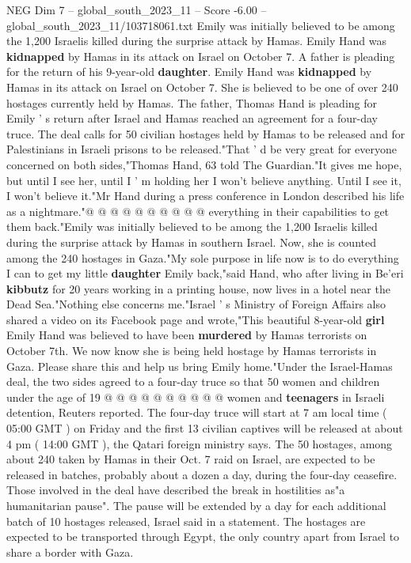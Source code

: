 \begin{textsample}{NEG Dim 7 – global\_south\_2023\_11 – Score -6.00 – global\_south\_2023\_11/103718061.txt}  \label{ex:f7_neg_326}
Emily was initially believed to be among the 1,200 Israelis killed during the surprise attack by Hamas.
Emily Hand was \textbf{kidnapped} by Hamas in its attack on Israel on October 7.
A father is pleading for the return of his 9-year-old \textbf{daughter}.
Emily Hand was \textbf{kidnapped} by Hamas in its attack on Israel on October 7.
She is believed to be one of over 240 hostages currently held by Hamas.
The father, Thomas Hand is pleading for Emily ' s return after Israel and Hamas reached an agreement for a four-day truce.
The deal calls for 50 civilian hostages held by Hamas to be released and for Palestinians in Israeli prisons to be released."That ' d be very great for everyone concerned on both sides,"Thomas Hand, 63 told The Guardian."It gives me hope, but until I see her, until I ' m holding her I won't believe anything.
Until I see it, I won't believe it."Mr Hand during a press conference in London described his life as a nightmare."@ @ @ @ @ @ @ @ @ @ everything in their capabilities to get them back."Emily was initially believed to be among the 1,200 Israelis killed during the surprise attack by Hamas in southern Israel.
Now, she is counted among the 240 hostages in Gaza."My sole purpose in life now is to do everything I can to get my little \textbf{daughter} Emily back,"said Hand, who after living in Be'eri \textbf{kibbutz} for 20 years working in a printing house, now lives in a hotel near the Dead Sea."Nothing else concerns me."Israel ' s Ministry of Foreign Affairs also shared a video on its Facebook page and wrote,"This beautiful 8-year-old \textbf{girl} Emily Hand was believed to have been \textbf{murdered} by Hamas terrorists on October 7th.
We now know she is being held hostage by Hamas terrorists in Gaza.
Please share this and help us bring Emily home."Under the Israel-Hamas deal, the two sides agreed to a four-day truce so that 50 women and children under the age of 19 @ @ @ @ @ @ @ @ @ @ women and \textbf{teenagers} in Israeli detention, Reuters reported.
The four-day truce will start at 7 am local time ( 05:00 GMT ) on Friday and the first 13 civilian captives will be released at about 4 pm ( 14:00 GMT ), the Qatari foreign ministry says.
The 50 hostages, among about 240 taken by Hamas in their Oct. 7 raid on Israel, are expected to be released in batches, probably about a dozen a day, during the four-day ceasefire.
Those involved in the deal have described the break in hostilities as"a humanitarian pause".
The pause will be extended by a day for each additional batch of 10 hostages released, Israel said in a statement.
The hostages are expected to be transported through Egypt, the only country apart from Israel to share a border with Gaza.

\end{textsample}
